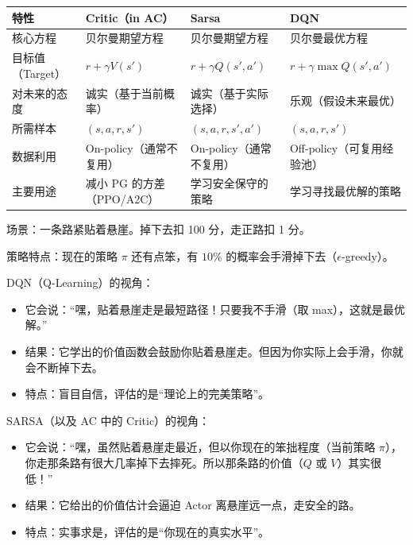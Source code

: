 \begin{longtable}[]{@{}
  >{\raggedright\arraybackslash}p{}
  >{\raggedright\arraybackslash}p{}
  >{\raggedright\arraybackslash}p{}
  >{\raggedright\arraybackslash}p{}@{}}
\toprule
特性 & Critic（in AC） & Sarsa & DQN \\
\midrule
\endhead
核心方程 & 贝尔曼期望方程 & 贝尔曼期望方程 & 贝尔曼最优方程 \\
目标值（Target） & \(r+\gamma V(s')\) & \(r+\gamma Q(s',a')\) & \(r+\gamma\max Q(s',a')\) \\
对未来的态度 & 诚实（基于当前概率） & 诚实（基于实际选择） & 乐观（假设未来最优） \\
所需样本 & \((s,a,r,s')\) & \((s,a,r,s',a')\) & \((s,a,r,s')\) \\
数据利用 & On-policy（通常不复用） & On-policy（通常不复用） & Off-policy（可复用经验池） \\
主要用途 & 减小 PG 的方差（PPO/A2C） & 学习安全保守的策略 & 学习寻找最优解的策略 \\
\bottomrule
\end{longtable}

场景：一条路紧贴着悬崖。掉下去扣 100 分，走正路扣 1 分。

策略特点：现在的策略 \(\pi\) 还有点笨，有 \(10\%\) 的概率会手滑掉下去（\(\epsilon\)-greedy）。

DQN（Q-Learning）的视角：

\begin{itemize}
\tightlist
\item
  它会说：``嘿，贴着悬崖走是最短路径！只要我不手滑（取 max），这就是最优解。''
\item
  结果：它学出的价值函数会鼓励你贴着悬崖走。但因为你实际上会手滑，你就会不断掉下去。
\item
  特点：盲目自信，评估的是``理论上的完美策略''。
\end{itemize}

SARSA（以及 AC 中的 Critic）的视角：

\begin{itemize}
\tightlist
\item
  它会说：``嘿，虽然贴着悬崖走最近，但以你现在的笨拙程度（当前策略 \(\pi\)），你走那条路有很大几率掉下去摔死。所以那条路的价值（\(Q\) 或 \(V\)）其实很低！''
\item
  结果：它给出的价值估计会逼迫 Actor 离悬崖远一点，走安全的路。
\item
  特点：实事求是，评估的是``你现在的真实水平''。
\end{itemize}

